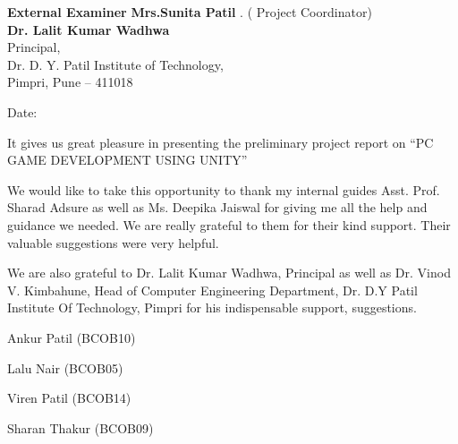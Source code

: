 \documentclass[12pt]{report}
\begin{document}
\vspace{0.7 cm}
\setlength{\parindent}{0 em}
\textbf{  External Examiner}   \hspace{7cm}      \textbf    {Mrs.Sunita Patil }   \hspace{5.5cm}         
\centering
.   \hspace{10cm}  ( Project Coordinator)  \hspace{2 cm}    \\
\vspace{0.4cm}
\centering
\textbf{Dr. Lalit Kumar Wadhwa}\\
 Principal,\\
 Dr. D. Y. Patil Institute of Technology,\\
 Pimpri, Pune – 411018
\vspace{0.1 cm}
\begin{flushleft}

Date:
\end{flushleft}


\clearpage





\vspace{4 cm}
\vspace{1 cm}
\justifying
\vspace{1 cm}
\justifying
\setlength{\parindent}{4em}
\setlength{\parskip}{1em}
\renewcommand{\baselinestretch}{1.5}
\normalsize
It gives us great pleasure in presenting the preliminary project report on “PC GAME DEVELOPMENT USING UNITY”


We would like to take this opportunity to thank my internal guides Asst. Prof. Sharad Adsure as well as Ms. Deepika Jaiswal for giving me all the help and guidance we needed. We are really grateful to them for their kind support. Their valuable suggestions were very helpful. 


We are also grateful to Dr. Lalit Kumar Wadhwa, Principal as well as Dr. Vinod V. Kimbahune, Head of Computer Engineering Department, Dr. D.Y Patil Institute Of Technology, Pimpri for his indispensable support, suggestions.


\begin{flushright}

\normalsize  {Ankur Patil (BCOB10)}

\normalsize  {Lalu Nair (BCOB05)}

\normalsize  {Viren Patil (BCOB14)}

\normalsize  {Sharan Thakur (BCOB09)}
\end{flushright}
\clearpage
 
\end{document}
